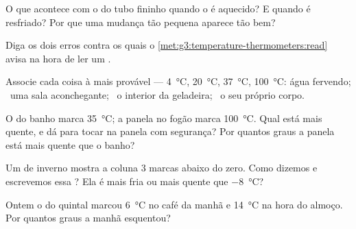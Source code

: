 \begin{exercise}[$\star$]\label{exo:g3:temperature-thermometers:3}
O que acontece com o  do tubo fininho quando o  é
aquecido? E quando é resfriado? Por que uma mudança tão pequena
aparece tão bem?
\end{exercise}

\begin{exercise}[$\star$]\label{exo:g3:temperature-thermometers:4}
Diga os dois erros contra os quais o
\cref{met:g3:temperature-thermometers:read} avisa na hora de ler um
.
\end{exercise}

\begin{exercise}[$\star$]\label{exo:g3:temperature-thermometers:5}
Associe cada coisa à  mais provável ---
\qty{4}{\celsius}, \qty{20}{\celsius}, \qty{37}{\celsius},
\qty{100}{\celsius}: água fervendo; \ uma sala aconchegante; \ o
interior da geladeira; \ o seu próprio corpo.
\end{exercise}

\begin{exercise}[$\star$]\label{exo:g3:temperature-thermometers:6}
O  do banho marca \qty{35}{\celsius}; a panela no fogão
marca \qty{100}{\celsius}. Qual está mais quente, e dá para tocar na
panela com segurança? Por quantos graus a panela está mais quente que
o banho?
\end{exercise}

\begin{exercise}[$\star$]\label{exo:g3:temperature-thermometers:7}
Um  de inverno mostra a coluna $3$ marcas abaixo do zero.
Como dizemos e escrevemos essa ? Ela é mais fria ou mais
quente que \qty{-8}{\celsius}?
\end{exercise}

\begin{exercise}[$\star$]\label{exo:g3:temperature-thermometers:8}
Ontem o  do quintal marcou \qty{6}{\celsius} no café da
manhã e \qty{14}{\celsius} na hora do almoço. Por quantos graus a
manhã esquentou?
\end{exercise}


